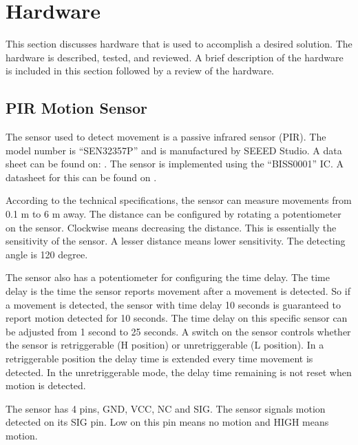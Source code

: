 \section{Hardware}
This section discusses hardware that is used to accomplish a desired solution.  The hardware is described, tested, and reviewed. A brief description of the hardware is included in this section followed by a review of the hardware.

\subsection{PIR Motion Sensor}

The sensor used to detect movement is a passive infrared sensor (PIR). The model
number is \enquote{SEN32357P} and is manufactured by SEEED Studio. A data sheet
can be found on:
\cite{datasheet_pir1}. The
sensor is implemented using the \enquote{BISS0001} IC. A datasheet for this can
be found on \cite{datasheet_pir2}.

According to the technical specifications, the sensor can measure movements from 0.1 m to 6
m away. The distance can be configured by rotating a potentiometer on the
sensor. Clockwise means decreasing the distance. This is essentially the
sensitivity of the sensor. A lesser distance means lower sensitivity. The detecting angle is 120 degree.

The sensor also has a potentiometer for configuring the time delay. The time
delay is the time the sensor reports movement after a movement is detected. So
if a movement is detected, the sensor with time delay 10 seconds is guaranteed
to report motion detected for 10 seconds. The time delay on this specific sensor
can be adjusted from 1 second to 25 seconds. A switch on the sensor controls
whether the sensor is retriggerable (H position) or unretriggerable (L
position). In a retriggerable position the delay time is extended every time
movement is detected. In the unretriggerable mode, the delay time remaining is
not reset when motion is detected.

The sensor has 4 pins, GND, VCC, NC and SIG. The sensor signals motion detected
on its SIG pin. Low on this pin means no motion and HIGH means motion.

